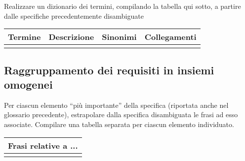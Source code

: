\begin{templateblock}
    Realizzare un dizionario dei termini, compilando la tabella qui sotto,
    a partire dalle specifiche precedentemente disambiguate
\end{templateblock}

\begin{tabularx}{\linewidth}{|Y|Y|Y|Y|}
    \hline
    \textbf{Termine} & \textbf{Descrizione} & \textbf{Sinonimi} & \textbf{Collegamenti} \\\hline
                     &                      &                   &                       \\ \hline
\end{tabularx}

\subsection*{Raggruppamento dei requisiti in insiemi omogenei}

\begin{templateblock}
    Per ciascun elemento “più importante” della specifica
    (riportata anche nel glossario precedente), estrapolare dalla specifica
    disambiguata le frasi ad esso associate.
    Compilare una tabella separata per ciascun elemento individuato.
\end{templateblock}

\begin{tabularx}{\linewidth}{|X|}
    \hline
    \rowcolor{tblhdrcolor}
    \textbf{Frasi relative a ...} \\\hline
    \\ \hline
\end{tabularx}
